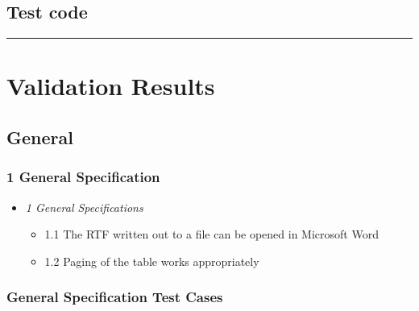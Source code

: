 \documentclass[]{article}
\providecommand{\tightlist}{%
  \setlength{\itemsep}{0pt}\setlength{\parskip}{0pt}}
\begin{document}
\hypertarget{test-code}{%
\subsection{Test code}\label{test-code}}

\begin{center}\rule{0.5\linewidth}{0.5pt}\end{center}

\hypertarget{validation-results}{%
\section{Validation Results}\label{validation-results}}

\hypertarget{general}{%
\subsection{General}\label{general}}

\hypertarget{general-specification}{%
\subsubsection{1 General Specification}\label{general-specification}}

\begin{itemize}
\tightlist
\item
  \emph{1 General Specifications}

  \begin{itemize}
  \tightlist
  \item
    1.1 The RTF written out to a file can be opened in Microsoft Word
  \item
    1.2 Paging of the table works appropriately
  \end{itemize}
\end{itemize}

\hypertarget{general-specification-test-cases}{%
\subsubsection{General Specification Test
Cases}\label{general-specification-test-cases}}
\end{document}
